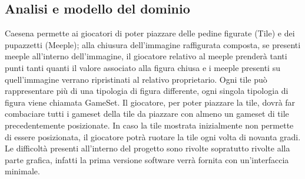 \subsection{Analisi e modello del dominio}
Caesena permette ai giocatori di poter piazzare delle pedine figurate (Tile) e dei pupazzetti (Meeple); alla chiusura dell'immagine raffigurata composta, se presenti meeple all'interno dell'immagine, il giocatore relativo al meeple prenderà tanti punti tanti quanti il valore associato alla figura chiusa e i meeple presenti su quell'immagine verrano ripristinati al relativo proprietario.
Ogni tile può rappresentare più di una tipologia di figura differente, ogni singola tipologia di figura viene chiamata GameSet. Il giocatore, per poter piazzare la tile, dovrà far combaciare tutti i gameset della tile da piazzare con almeno un gameset di tile precedentemente posizionate.
In caso la tile mostrata inizialmente non permette di essere posizionata, il giocatore potrà ruotare la tile ogni volta di novanta gradi. Le difficoltà presenti all'interno del progetto sono rivolte sopratutto rivolte alla parte grafica, infatti la prima versione software verrà fornita con un'interfaccia minimale.
